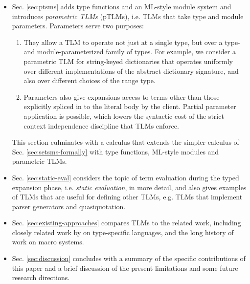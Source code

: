 \documentclass[acmsmall,10pt,review,anonymous]{acmart}\settopmatter{printfolios=true}
\begin{document}
\begin{itemize}
\item Sec. \ref{sec:ptsms} adds type functions and an ML-style module system and introduces \emph{parametric TLMs} (pTLMs), i.e. TLMs that take type and module parameters. Parameters serve two purposes:
\begin{enumerate}
\item They allow a TLM to operate not just at a single type, but over a type- and module-parameterized family of types. For example, we consider a parametric TLM for string-keyed dictionaries that operates uniformly over different implementations of the abstract dictionary signature, and also over different choices of the range type.
\item Parameters also give expansions access to terms other than those explicitly spliced in to the literal body by the client. %
Partial parameter application is possible, which lowers the syntactic cost of the strict context independence discipline that TLMs enforce.
\end{enumerate}
This section culminates with a calculus that extends the simpler calculus of Sec. \ref{sec:setsms-formally} with type functions, ML-style modules and parametric TLMs.
\item Sec. \ref{sec:static-eval} considers the topic of term evaluation during the typed expansion phase, i.e. \emph{static evaluation}, in  more detail, and also gives examples of TLMs that are useful for defining other TLMs, e.g. TLMs that implement parser generators and quasiquotation.
\item Sec. \ref{sec:existing-approaches} compares TLMs to the related work, including closely related work by \citet{TSLs,sac15} on type-specific languages, and the long history of work on macro systems.
\item Sec. \ref{sec:discussion} concludes with a summary of the specific contributions of this paper and a brief discussion of the present limitations and some future research directions.
\end{itemize}
\end{document}
